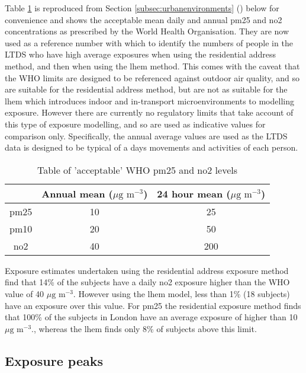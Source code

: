Table \ref{tab:whopmandno2levels} is reproduced from Section \ref{subsec:urbanenvironments} () below for convenience and shows the acceptable mean daily and annual \gls{pm25} and \gls{no2} concentrations as prescribed by the World Health Organisation. They are now used as a reference number with which to identify the numbers of people in the LTDS who have high average exposures when using the residential address method, and then when using the \gls{lhem} method. This comes with the caveat that the WHO limits are designed to be referenced against outdoor air quality, and so are suitable for the residential address method, but are not as suitable for the \gls{lhem} which introduces indoor and in-transport microenvironments to modelling exposure. However there are currently no regulatory limits that take account of this type of exposure modelling, and so are used as indicative values for comparison only. Specifically, the annual average values are used as the LTDS data is designed to be typical of a days movements and activities of each person.

\begin{table}[H]
\caption{Table of 'acceptable' WHO \gls{pm25} and \gls{no2} levels}
\centering
    \begin{tabular}{ | c | c | c |}
    \hline 
     & Annual mean ($\mu \text{g m}^{-3}$) & 24 hour mean ($\mu \text{g m}^{-3}$) \\ \hline
     \gls{pm25} & 10 & 25\\ \hline
     \gls{pm10} & 20 & 50\\ \hline
     \gls{no2} & 40 & 200\\ \hline
    \end{tabular}
\label{tab:whopmandno2levels}
\end{table}

Exposure estimates undertaken using the residential address exposure method find that 14\% of the subjects have a daily \gls{no2} exposure higher than the WHO value of 40 $\mu \text{g m}^{-3}$. However using the \gls{lhem} model, less than 1\% (18 subjects) have an  exposure over this value. For \gls{pm25} the residential exposure method finds that 100\% of the subjects in London have an average exposure of higher than 10 $\mu \text{g m}^{-3}$., whereas the \gls{lhem} finds only 8\% of subjects above this limit.

\subsection{Exposure peaks}
\label{subsec:exposure_peaks_by_age_group}

